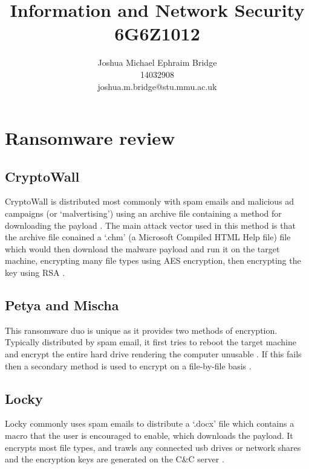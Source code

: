 \documentclass[12pt]{article}
\title{\vspace{3cm}\textbf{Information and Network Security}\\6G6Z1012}
\author{Joshua Michael Ephraim Bridge\\14032908\\joshua.m.bridge@stu.mmu.ac.uk}
\begin{document}
\maketitle

\tableofcontents


\newpage

\section{Ransomware review}
  \subsection{CryptoWall}
    CryptoWall is distributed most commonly with spam emails and malicious ad campaigns (or ‘malvertising’) using an archive file containing a method for downloading the payload \citep{symantec2016cryptowall}. The main attack vector used in this method is that the archive file conained a ‘.chm’ (a Microsoft Compiled HTML Help file) file which would then download the malware payload and run it on the target machine, encrypting many file types using AES encryption, then encrypting the key using RSA \citep{sophos2015cryptowall}.

  \subsection{Petya and Mischa}
    This ransomware duo is unique as it provides two methods of encryption. Typically distributed by spam email, it first tries to reboot the target machine and encrypt the entire hard drive rendering the computer unusable \citep{malwarebytes2016petya}. If this fails then a secondary method is used to encrypt on a file-by-file basis \citep{avast2016petya}.

  \subsection{Locky}
    Locky commonly uses spam emails to distribute a ‘.docx’ file which contains a macro that the user is encouraged to enable, which downloads the payload. It encrypts most file types, and trawls any connected usb drives or network shares \citep{ducklin2016locky} and the encryption keys are generated on the C\&C server \citep{avast2017locky}.
\end{document}
